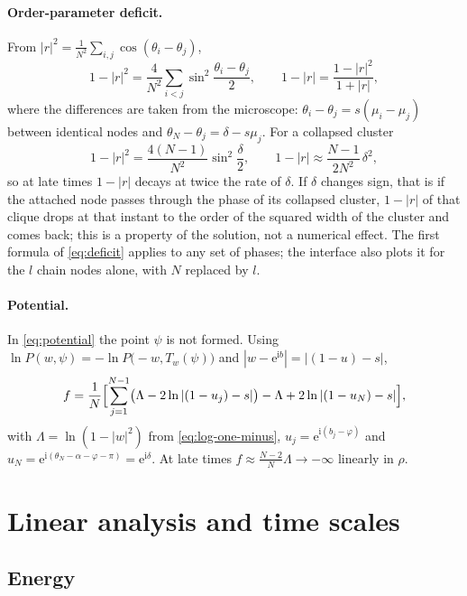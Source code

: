 \documentclass[a4paper,11pt]{article}
\newcommand{\T}{T}                       %
\newcommand{\e}{\mathrm{e}}
\newcommand{\ii}{\mathrm{i}}
\theoremstyle{remark}
\begin{document}
\paragraph{Order-parameter deficit.} From
$|r|^2=\frac1{N^2}\sum_{i,j}\cos(\theta_i-\theta_j)$,
\begin{equation}\label{eq:deficit}
1-|r|^2=\frac{4}{N^2}\sum_{i<j}\sin^2\frac{\theta_i-\theta_j}{2},\qquad
1-|r|=\frac{1-|r|^2}{1+|r|},
\end{equation}
where the differences are taken from the microscope:
$\theta_i-\theta_j=s(\mu_i-\mu_j)$ between identical nodes and
$\theta_N-\theta_j=\delta-s\mu_j$. For a collapsed cluster
\begin{equation}\label{eq:deficit-late}
1-|r|^2=\frac{4(N-1)}{N^2}\sin^2\frac\delta2,\qquad
1-|r|\approx\frac{N-1}{2N^2}\,\delta^2 ,
\end{equation}
so at late times $1-|r|$ decays at twice the rate of $\delta$. If $\delta$
changes sign, that is if the attached node passes through the phase of its
collapsed cluster, $1-|r|$ of that clique drops at that instant to the order of
the squared width of the cluster and comes back; this is a property of the
solution, not a numerical effect. The first
formula of \eqref{eq:deficit} applies to any set of phases; the interface also
plots it for the $l$ chain nodes alone, with $N$ replaced by $l$.

\paragraph{Potential.} In \eqref{eq:potential} the point $\psi$ is not formed.
Using $\ln P(w,\psi)=-\ln P\bigl(-w,\T_w(\psi)\bigr)$ and
$|w-\e^{\ii b}|=|(1-u)-s|$,
\begin{equation}\label{eq:stable-potential}
f=\frac1N\Bigl[\sum_{j=1}^{N-1}\bigl(\Lambda-2\ln|(1-u_j)-s|\bigr)
-\Lambda+2\ln|(1-u_N)-s|\Bigr],
\end{equation}
with $\Lambda=\ln(1-|w|^2)$ from \eqref{eq:log-one-minus},
$u_j=\e^{\ii(b_j-\varphi)}$ and $u_N=\e^{\ii(\theta_N-\alpha-\varphi-\pi)}=\e^{\ii\delta}$.
At late times $f\approx\frac{N-2}{N}\Lambda\to-\infty$ linearly in $\rho$.

\section{Linear analysis and time scales}\label{sec:linear}

\subsection{Energy}
\end{document}
